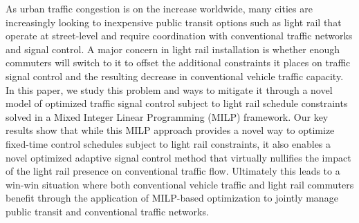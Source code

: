 As urban traffic congestion is on the increase worldwide, many cities
are increasingly looking to inexpensive public transit options such as
light rail that operate at street-level and require coordination with
conventional traffic networks and signal control. A major concern in
light rail installation is whether enough commuters will switch to it
to offset the additional constraints it places on traffic signal
control and the resulting decrease in conventional vehicle traffic
capacity. In this paper, we study this problem and ways to mitigate it
through a novel model of optimized traffic signal control subject to
light rail schedule constraints solved in a Mixed Integer Linear
Programming (MILP) framework. Our key results show that while this 
MILP approach provides a novel way to optimize fixed-time control
schedules subject to light rail constraints, it also enables a
novel optimized adaptive signal control method that virtually
nullifies the impact of the light rail presence on conventional
traffic flow.  Ultimately this leads to a win-win situation where both
conventional vehicle traffic and light rail commuters benefit through
the application of MILP-based optimization to jointly manage public
transit and conventional traffic networks.
